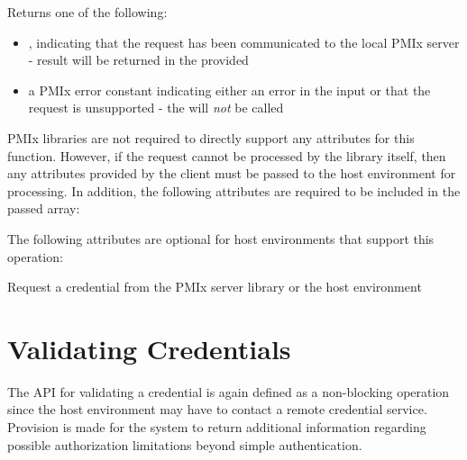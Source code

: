 \begin{arglist}
\end{arglist}

Returns one of the following:

\begin{itemize}
    \item {}, indicating that the request has been communicated to the local \ac{PMIx} server - result will be returned in the provided 
    \item a \ac{PMIx} error constant indicating either an error in the input or that the request is unsupported - the  will \textit{not} be called
\end{itemize}

\reqattrstart
\ac{PMIx} libraries are not required to directly support any attributes for this function. However, if the request cannot be processed by the library itself, then any attributes provided by the client must be passed to the host environment for processing. In addition, the following attributes are required to be included in the passed  array:


\reqattrend

\optattrstart
The following attributes are optional for host environments that support this operation:


\optattrend

\descr

Request a credential from the \ac{PMIx} server library or the host environment

\section{Validating Credentials}
\label{chap:api_security:validate}

The \ac{API} for validating a credential is again defined as a non-blocking operation since the host environment may have to contact a remote credential service. Provision is made for the system to return additional information regarding possible authorization limitations beyond simple authentication.

